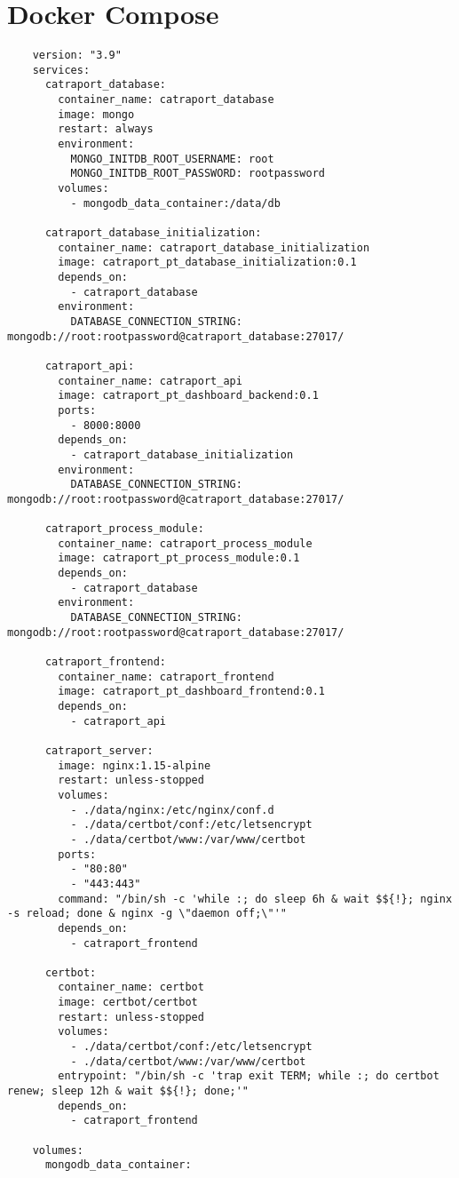\section{Docker Compose}\label{containerscompose}
\begin{Verbatim}
    version: "3.9"
    services:
      catraport_database:
        container_name: catraport_database
        image: mongo
        restart: always
        environment:
          MONGO_INITDB_ROOT_USERNAME: root
          MONGO_INITDB_ROOT_PASSWORD: rootpassword
        volumes:
          - mongodb_data_container:/data/db
      
      catraport_database_initialization:
        container_name: catraport_database_initialization
        image: catraport_pt_database_initialization:0.1
        depends_on:
          - catraport_database
        environment:
          DATABASE_CONNECTION_STRING: mongodb://root:rootpassword@catraport_database:27017/
      
      catraport_api:
        container_name: catraport_api
        image: catraport_pt_dashboard_backend:0.1
        ports:
          - 8000:8000
        depends_on:
          - catraport_database_initialization
        environment:
          DATABASE_CONNECTION_STRING: mongodb://root:rootpassword@catraport_database:27017/
    
      catraport_process_module:
        container_name: catraport_process_module
        image: catraport_pt_process_module:0.1
        depends_on:
          - catraport_database
        environment:
          DATABASE_CONNECTION_STRING: mongodb://root:rootpassword@catraport_database:27017/
    
      catraport_frontend:
        container_name: catraport_frontend
        image: catraport_pt_dashboard_frontend:0.1
        depends_on:
          - catraport_api
    
      catraport_server:
        image: nginx:1.15-alpine
        restart: unless-stopped
        volumes:
          - ./data/nginx:/etc/nginx/conf.d
          - ./data/certbot/conf:/etc/letsencrypt
          - ./data/certbot/www:/var/www/certbot
        ports:
          - "80:80"
          - "443:443"
        command: "/bin/sh -c 'while :; do sleep 6h & wait $${!}; nginx -s reload; done & nginx -g \"daemon off;\"'"
        depends_on:
          - catraport_frontend
    
      certbot:
        container_name: certbot
        image: certbot/certbot
        restart: unless-stopped
        volumes:
          - ./data/certbot/conf:/etc/letsencrypt
          - ./data/certbot/www:/var/www/certbot
        entrypoint: "/bin/sh -c 'trap exit TERM; while :; do certbot renew; sleep 12h & wait $${!}; done;'"
        depends_on:
          - catraport_frontend
    
    volumes:
      mongodb_data_container:
    
\end{Verbatim}
